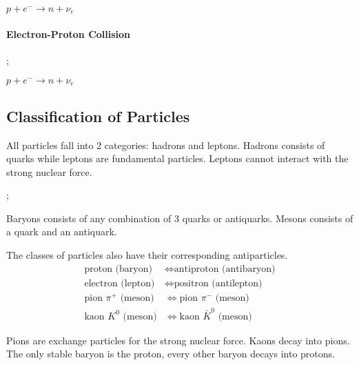 \documentclass[10pt]{article}
\begin{document}
\begin{multicols}{2}
\begin{center}
		$p + e^- \longrightarrow n + \nu_e$
	\end{center}

	\paragraph{Electron-Proton Collision}
	\begin{center}
		;

		$p + e^- \longrightarrow n + \nu_e$
	\end{center}

	\subsection{Classification of Particles}
	All particles fall into 2 categories: hadrons and leptons. Hadrons consists of
	quarks while leptons are fundamental particles. Leptons cannot interact with the
	strong nuclear force.

	\begin{center}
		;
	\end{center}

	Baryons consists of any combination of 3 quarks or antiquarks. Mesons consists
	of a quark and an antiquark.
	\medskip

	The classes of particles also have their corresponding antiparticles.
	\begin{align*}
		\text{proton (baryon)}      & \Leftrightarrow \text{antiproton (antibaryon)}  \\
		\text{electron (lepton)}    & \Leftrightarrow \text{positron (antilepton)}    \\
		\text{pion $\pi^+$ (meson)} & \Leftrightarrow \text{pion $\pi^-$ (meson)}     \\
		\text{kaon $K^0$ (meson)}   & \Leftrightarrow \text{kaon $\bar{K}^0$ (meson)}
	\end{align*}

	Pions are exchange particles for the strong nuclear force. Kaons decay into
	pions. The only stable baryon is the proton, every other baryon decays into
	protons.
	\medskip


\end{multicols}
\end{document}
